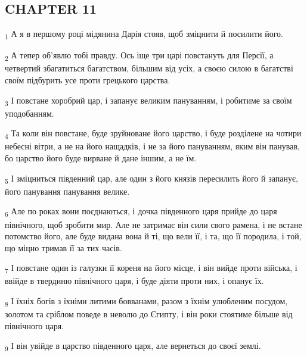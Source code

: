 \subsection{CHAPTER 11}
\begin{tcolorbox}
\textsubscript{1} А я в першому році мідянина Дарія стояв, щоб зміцнити й посилити його.
\end{tcolorbox}
\begin{tcolorbox}
\textsubscript{2} А тепер об'явлю тобі правду. Ось іще три царі повстануть для Персії, а четвертий збагатиться багатством, більшим від усіх, а своєю силою в багатстві своїм підбурить усе проти грецького царства.
\end{tcolorbox}
\begin{tcolorbox}
\textsubscript{3} І повстане хоробрий цар, і запанує великим пануванням, і робитиме за своїм уподобанням.
\end{tcolorbox}
\begin{tcolorbox}
\textsubscript{4} Та коли він повстане, буде зруйноване його царство, і буде розділене на чотири небесні вітри, а не на його нащадків, і не за його пануванням, яким він панував, бо царство його буде вирване й дане іншим, а не їм.
\end{tcolorbox}
\begin{tcolorbox}
\textsubscript{5} І зміцниться південний цар, але один з його князів пересилить його й запанує, його панування панування велике.
\end{tcolorbox}
\begin{tcolorbox}
\textsubscript{6} Але по роках вони поєднаються, і дочка південного царя прийде до царя північного, щоб зробити мир. Але не затримає він сили свого рамена, і не встане потомство його, але буде видана вона й ті, що вели її, і та, що її породила, і той, що міцно тримав її за тих часів.
\end{tcolorbox}
\begin{tcolorbox}
\textsubscript{7} І повстане один із галузки її кореня на його місце, і він вийде проти війська, і ввійде в твердиню північного царя, і буде діяти проти них, і опанує їх.
\end{tcolorbox}
\begin{tcolorbox}
\textsubscript{8} І їхніх богів з їхніми литими бовванами, разом з їхнім улюбленим посудом, золотом та сріблом поведе в неволю до Єгипту, і він роки стоятиме більше від північного царя.
\end{tcolorbox}
\begin{tcolorbox}
\textsubscript{9} І він увійде в царство південного царя, але вернеться до своєї землі.
\end{tcolorbox}

